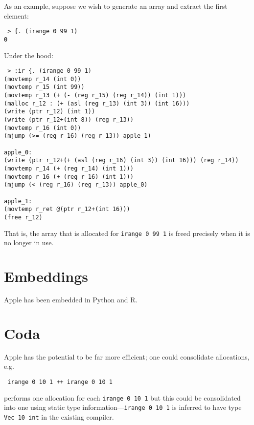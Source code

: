 \documentclass{article}
\begin{document}
As an example, suppose we wish to generate an array and extract the first element:

\begin{verbatim}
 > {. (irange 0 99 1)
0
\end{verbatim}

Under the hood:

\begin{verbatim}
 > :ir {. (irange 0 99 1)
(movtemp r_14 (int 0))
(movtemp r_15 (int 99))
(movtemp r_13 (+ (- (reg r_15) (reg r_14)) (int 1)))
(malloc r_12 : (+ (asl (reg r_13) (int 3)) (int 16)))
(write (ptr r_12) (int 1))
(write (ptr r_12+(int 8)) (reg r_13))
(movtemp r_16 (int 0))
(mjump (>= (reg r_16) (reg r_13)) apple_1)

apple_0:
(write (ptr r_12+(+ (asl (reg r_16) (int 3)) (int 16))) (reg r_14))
(movtemp r_14 (+ (reg r_14) (int 1)))
(movtemp r_16 (+ (reg r_16) (int 1)))
(mjump (< (reg r_16) (reg r_13)) apple_0)

apple_1:
(movtemp r_ret @(ptr r_12+(int 16)))
(free r_12)
\end{verbatim}

That is, the array that is allocated for {\tt irange 0 99 1} is freed precisely when it is no longer in use.



\section{Embeddings}

Apple has been embedded in Python and R.

\section{Coda}

Apple has the potential to be far more efficient; one could consolidate allocations, e.g.

\begin{verbatim}
 irange 0 10 1 ++ irange 0 10 1
\end{verbatim}

performs one allocation for each {\tt irange 0 10 1} but this could be consolidated into one using static type information---{\tt irange 0 10 1} is inferred to have type {\tt Vec 10 int} in the existing compiler.
\end{document}
